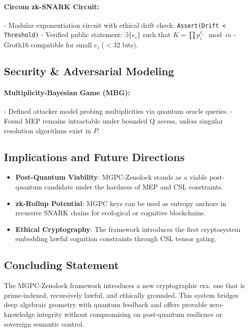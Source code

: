 \documentclass{article}
\theoremstyle{plain}
\begin{document}
\paragraph{Circom zk-SNARK Circuit:}
- Modular exponentiation circuit with ethical drift check:
  \texttt{Assert(Drift < Threshold)}
- Verified public statement: $\exists \{e_i\}$ such that $K = \prod p_i^{e_i} \mod m$
- Groth16 compatible for small $e_i$ ($< 32$ bits).

\subsection{Security & Adversarial Modeling}

\paragraph{Multiplicity-Bayesian Game (MBG):}
- Defined attacker model probing multiplicities via quantum oracle queries.
- Found MEP remains intractable under bounded Q access, unless singular resolution algorithms exist in $P$.

\subsection{Implications and Future Directions}

\begin{itemize}
    \item \textbf{Post-Quantum Viability}: MGPC-Zenolock stands as a viable post-quantum candidate under the hardness of MEP and CSL constraints.
    \item \textbf{zk-Rollup Potential}: MGPC keys can be used as entropy anchors in recursive SNARK chains for ecological or cognitive blockchains.
    \item \textbf{Ethical Cryptography}: The framework introduces the first cryptosystem embedding lawful cognition constraints through CSL tensor gating.
\end{itemize}

\subsection{Concluding Statement}

The MGPC-Zenolock framework introduces a new cryptographic era: one that is prime-indexed, recursively lawful, and ethically grounded. This system bridges deep algebraic geometry with quantum feedback and offers provable zero-knowledge integrity without compromising on post-quantum resilience or sovereign semantic control.

\nocite{*}


\end{document}
